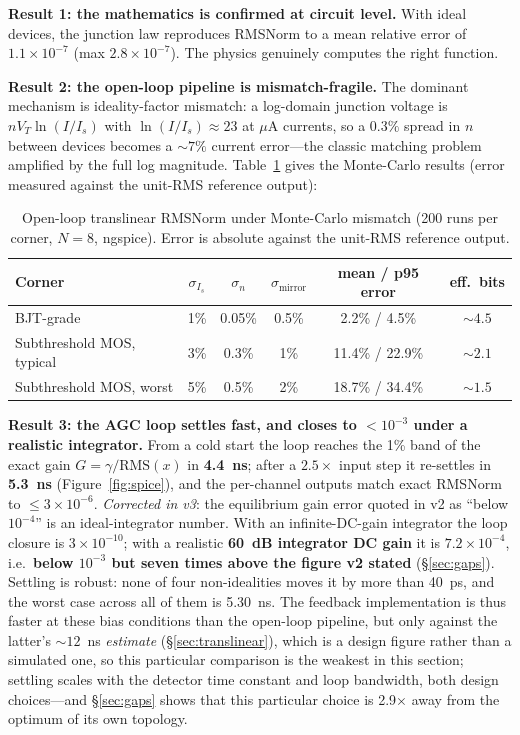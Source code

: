 \documentclass[11pt]{article}
\begin{document}
\textbf{Result 1: the mathematics is confirmed at circuit level.} With ideal devices, the junction law reproduces RMSNorm to a mean relative error of $1.1\times10^{-7}$ (max $2.8\times10^{-7}$). The physics genuinely computes the right function.

\textbf{Result 2: the open-loop pipeline is mismatch-fragile.} The dominant mechanism is ideality-factor mismatch: a log-domain junction voltage is $n V_T \ln(I/I_s)$ with $\ln(I/I_s) \approx 23$ at $\mu$A currents, so a $0.3\%$ spread in $n$ between devices becomes a ${\sim}7\%$ current error---the classic matching problem~\cite{pelgrom1989} amplified by the full log magnitude. Table~\ref{tab:mismatch} gives the Monte-Carlo results (error measured against the unit-RMS reference output):

\begin{table}[h]
\centering
\caption{Open-loop translinear RMSNorm under Monte-Carlo mismatch (200 runs per corner, $N=8$, ngspice). Error is absolute against the unit-RMS reference output.}
\label{tab:mismatch}
\small
\begin{tabular}{lccccc}
\toprule
Corner & $\sigma_{I_s}$ & $\sigma_n$ & $\sigma_{\text{mirror}}$ & mean / p95 error & eff.\ bits \\
\midrule
BJT-grade & 1\% & 0.05\% & 0.5\% & 2.2\% / 4.5\% & ${\sim}4.5$ \\
Subthreshold MOS, typical & 3\% & 0.3\% & 1\% & 11.4\% / 22.9\% & ${\sim}2.1$ \\
Subthreshold MOS, worst & 5\% & 0.5\% & 2\% & 18.7\% / 34.4\% & ${\sim}1.5$ \\
\bottomrule
\end{tabular}
\end{table}

\textbf{Result 3: the AGC loop settles fast, and closes to $<10^{-3}$ under a realistic integrator.} From a cold start the loop reaches the 1\% band of the exact gain $G = \gamma/\text{RMS}(x)$ in \textbf{4.4~ns}; after a $2.5\times$ input step it re-settles in \textbf{5.3~ns} (Figure~\ref{fig:spice}), and the per-channel outputs match exact RMSNorm to $\leq\!3\times10^{-6}$. \textit{Corrected in v3}: the equilibrium gain error quoted in v2 as ``below $10^{-4}$'' is an ideal-integrator number. With an infinite-DC-gain integrator the loop closure is $3\times10^{-10}$; with a realistic \textbf{60~dB integrator DC gain} it is $7.2\times10^{-4}$, i.e.\ \textbf{below $10^{-3}$ but seven times above the figure v2 stated} (\S\ref{sec:gaps}). Settling is robust: none of four non-idealities moves it by more than 40~ps, and the worst case across all of them is 5.30~ns. The feedback implementation is thus faster at these bias conditions than the open-loop pipeline, but only against the latter's ${\sim}12$~ns \textit{estimate} (\S\ref{sec:translinear}), which is a design figure rather than a simulated one, so this particular comparison is the weakest in this section; settling scales with the detector time constant and loop bandwidth, both design choices---and \S\ref{sec:gaps} shows that this particular choice is 2.9$\times$ away from the optimum of its own topology.
\end{document}
